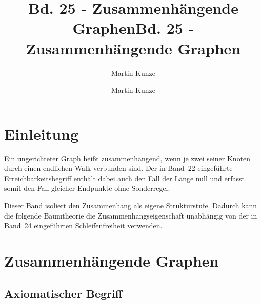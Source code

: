 \documentclass[main.tex]{subfiles}
\title{Bd. 25 - Zusammenhängende Graphen}
\author{Martin Kunze}
\date{}
\begin{document}
\title{Bd. 25 - Zusammenhängende Graphen}
\author{Martin Kunze}
\date{}
\hypersetup{pageanchor=false}
\maketitle
\hypersetup{pageanchor=true}
\setcounter{tocdepth}{3}
\tableofcontents
\setcounter{file}{25}
\renewcommand{\FormulaBandID}{25}

\chapter{Einleitung}

Ein ungerichteter Graph heißt zusammenhängend, wenn je zwei seiner Knoten
durch einen endlichen Walk verbunden sind. Der in Band~22 eingeführte
Erreichbarkeitsbegriff enthält dabei auch den Fall der Länge null und erfasst
somit den Fall gleicher Endpunkte ohne Sonderregel.

Dieser Band isoliert den Zusammenhang als eigene Strukturstufe. Dadurch
kann die folgende Baumtheorie die Zusammenhangseigenschaft unabhängig von
der in Band~24 eingeführten Schleifenfreiheit verwenden.

\chapter{Zusammenhängende Graphen}

\section{Axiomatischer Begriff}



\end{document}
